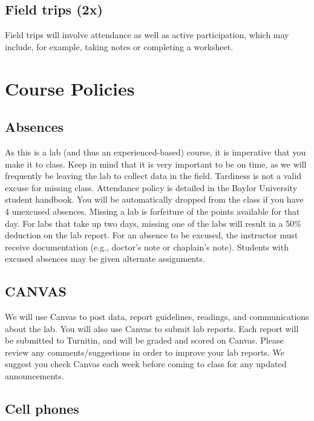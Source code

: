 \documentclass[11pt,]{article}
\begin{document}
\subsection{Field trips (2x)}\label{field-trips-2x}

Field trips will involve attendance as well as active participation,
which may include, for example, taking notes or completing a worksheet.

\section{Course Policies}\label{course-policies}

\subsection{Absences}\label{absences}

As this is a lab (and thus an experienced-based) course, it is
imperative that you make it to class. Keep in mind that it is very
important to be on time, as we will frequently be leaving the lab to
collect data in the field. Tardiness is not a valid excuse for missing
class. Attendance policy is detailed in the Baylor University student
handbook. You will be automatically dropped from the class if you have 4
unexcused absences. Missing a lab is forfeiture of the points available
for that day. For labs that take up two days, missing one of the labs
will result in a 50\% deduction on the lab report. For an absence to be
excused, the instructor must receive documentation (e.g., doctor's note
or chaplain's note). Students with excused absences may be given
alternate assignments.

\subsection{CANVAS}\label{canvas}

We will use Canvas to post data, report guidelines, readings, and
communications about the lab. You will also use Canvas to submit lab
reports. Each report will be submitted to Turnitin, and will be graded
and scored on Canvas. Please review any comments/suggestions in order to
improve your lab reports. We suggest you check Canvas each week before
coming to class for any updated announcements.

\subsection{Cell phones}\label{cell-phones}
\end{document}
